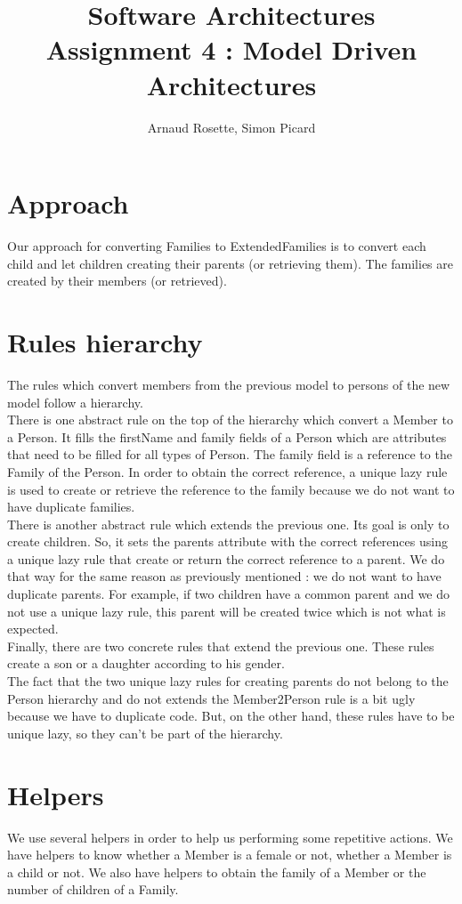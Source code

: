 \documentclass[a4paper,10pt]{article}
\title{Software Architectures\\ Assignment 4 : Model Driven Architectures}
\author{Arnaud Rosette, Simon Picard}
\begin{document}
\maketitle
\section{Approach}
Our approach for converting Families to ExtendedFamilies is to convert each child and let children creating their parents (or retrieving them). The families are created by their members (or retrieved).
\section{Rules hierarchy}
The rules which convert members from the previous model to persons of the new model follow a hierarchy. \\
There is one abstract rule on the top of the hierarchy which convert a Member to a Person. It fills the firstName and family fields of a Person which are attributes that need to be filled for all types of Person. The family field is a reference to the Family of the Person. In order to obtain the correct reference, a unique lazy rule is used to create or retrieve the reference to the family because we do not want to have duplicate families.\\
There is another abstract rule which extends the previous one. Its goal is only to create children. So, it sets the parents attribute with the correct references using a unique lazy rule that create or return the correct reference to a parent. We do that way for the same reason as previously mentioned : we do not want to have duplicate parents. For example, if two children have a common parent and we do not use a unique lazy rule, this parent will be created twice which is not what is expected.\\
Finally, there are two concrete rules that extend the previous one. These rules create a son or a daughter according to his gender. \\
The fact that the two unique lazy rules for creating parents do not belong to the Person hierarchy and do not extends the Member2Person rule is a bit ugly because we have to duplicate code. But, on the other hand, these rules have to be unique lazy, so they can't be part of the hierarchy.
\section{Helpers}
We use several helpers in order to help us performing some repetitive actions. We have helpers to know whether a Member is a female or not, whether a Member is a child or not. We also have helpers to obtain the family of a Member or the number of children of a Family.
\end{document}
